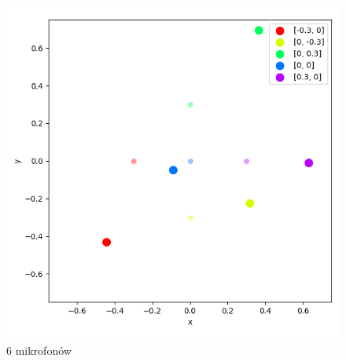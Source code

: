 \begin{frame}{}
\begin{columns}
\begin{column}{0.5\textwidth}
\begin{figure}
                \includegraphics[width=\textwidth]{../pics/mult_lat_2d_num/positions_6_mean.png}
                \caption{6 mikrofonów}
            \end{figure}
        \end{column}
    \end{columns}
\end{frame}

